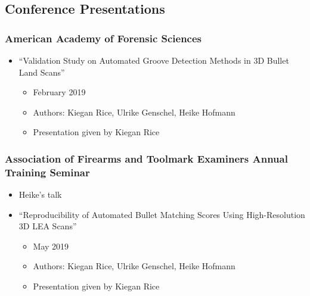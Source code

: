 \documentclass[]{book}
\providecommand{\tightlist}{%
  \setlength{\itemsep}{0pt}\setlength{\parskip}{0pt}}
\begin{document}
\hypertarget{conference-presentations}{%
\subsection{Conference Presentations}\label{conference-presentations}}

\hypertarget{american-academy-of-forensic-sciences}{%
\subsubsection{American Academy of Forensic Sciences}\label{american-academy-of-forensic-sciences}}

\begin{itemize}
\item
  ``Validation Study on Automated Groove Detection Methods in 3D Bullet Land Scans''

  \begin{itemize}
  \tightlist
  \item
    February 2019\\
  \item
    Authors: Kiegan Rice, Ulrike Genschel, Heike Hofmann
  \item
    Presentation given by Kiegan Rice
  \end{itemize}
\end{itemize}

\hypertarget{association-of-firearms-and-toolmark-examiners-annual-training-seminar}{%
\subsubsection{Association of Firearms and Toolmark Examiners Annual Training Seminar}\label{association-of-firearms-and-toolmark-examiners-annual-training-seminar}}

\begin{itemize}
\item
  Heike's talk
\item
  ``Reproducibility of Automated Bullet Matching Scores Using High-Resolution 3D LEA Scans''

  \begin{itemize}
  \tightlist
  \item
    May 2019
  \item
    Authors: Kiegan Rice, Ulrike Genschel, Heike Hofmann
  \item
    Presentation given by Kiegan Rice
  \end{itemize}
\end{itemize}
\end{document}
